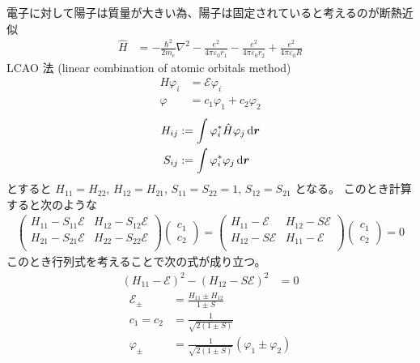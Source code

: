 \documentclass[uplatex,dvipdfmx,a4paper,11pt]{jlreq}
\newcommand{\rr}{\bm{r}}
\numberwithin{equation}{section}
\theoremstyle{definition}
\begin{document}
電子に対して陽子は質量が大きい為、陽子は固定されていると考えるのが断熱近似
\begin{align}
  \hat{H} & = -\frac{\hbar^2}{2m_e}\nabla^2 - \frac{e^2}{4\pi\varepsilon_0r_1} - \frac{e^2}{4\pi\varepsilon_0r_2} + \frac{e^2}{4\pi\varepsilon_0R}
\end{align}
LCAO 法 (linear combination of atomic orbitals method)
\begin{align}
  H\varphi_i & = \mathcal{E}\varphi_i        \\
  \varphi    & = c_1\varphi_1 + c_2\varphi_2
\end{align}
\begin{align}
  H_{ij} & := \int\varphi_i^*\hat{H}\varphi_j\dl{\rr} \\
  S_{ij} & := \int\varphi_i^*\varphi_j\dl{\rr}
\end{align}
とすると $H_{11} = H_{22}$, $H_{12} = H_{21}$, $S_{11} = S_{22} = 1$, $S_{12} = S_{21}$ となる。
このとき計算すると次のような
\begin{align}
  \begin{pmatrix}
    H_{11} - S_{11}\mathcal{E} & H_{12} - S_{12}\mathcal{E} \\
    H_{21} - S_{21}\mathcal{E} & H_{22} - S_{22}\mathcal{E} \\
  \end{pmatrix}
  \begin{pmatrix}
    c_1 \\ c_2
  \end{pmatrix}
  =
  \begin{pmatrix}
    H_{11} - \mathcal{E}  & H_{12} - S\mathcal{E} \\
    H_{12} - S\mathcal{E} & H_{11} - \mathcal{E}  \\
  \end{pmatrix}
  \begin{pmatrix}
    c_1 \\ c_2
  \end{pmatrix}
  = 0
\end{align}
このとき行列式を考えることで次の式が成り立つ。
\begin{align}
  (H_{11} - \mathcal{E})^2 - (H_{12} - S\mathcal{E})^2 & = 0
\end{align}
\begin{align}
  \mathcal{E}_\pm & = \frac{H_{11} \pm H_{12}}{1 \pm S}                    \\
  c_1 = c_2       & = \frac{1}{\sqrt{2(1 \pm S)}}                          \\
  \varphi_\pm     & = \frac{1}{\sqrt{2(1 \pm S)}}(\varphi_1 \pm \varphi_2)
\end{align}
\end{document}
